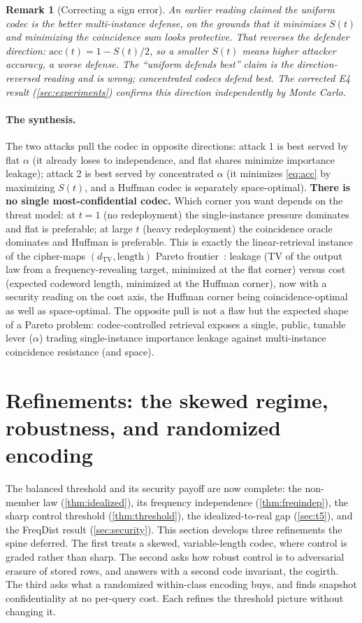 \documentclass[acmsmall,review]{acmart}
\newtheorem{remark}{Remark}
\newcommand{\TV}{d_{\mathrm{TV}}}
\newcommand{\al}{\alpha}                    %
\begin{document}
\begin{remark}[Correcting a sign error]
\label{rem:sign}
An earlier reading claimed the uniform codec is the \emph{better} multi-instance defense,
on the grounds that it minimizes $S(t)$ and minimizing the coincidence sum looks
protective. That reverses the defender direction: $\mathrm{acc}(t) = 1 - S(t)/2$, so a
\emph{smaller} $S(t)$ means \emph{higher} attacker accuracy, a worse defense. The ``uniform
defends best'' claim is the direction-reversed reading and is wrong; concentrated codecs
defend best. The corrected E4 result (\cref{sec:experiments}) confirms this direction
independently by Monte Carlo.
\end{remark}

\paragraph{The synthesis.}
The two attacks pull the codec in opposite directions: attack 1 is best served by flat
$\al$ (it already loses to independence, and flat shares minimize importance leakage);
attack 2 is best served by concentrated $\al$ (it minimizes \eqref{eq:acc} by maximizing
$S(t)$, and a Huffman codec is separately space-optimal). \textbf{There is no single
most-confidential codec.} Which corner you want depends on the threat model: at $t = 1$
(no redeployment) the single-instance pressure dominates and flat is preferable; at large
$t$ (heavy redeployment) the coincidence oracle dominates and Huffman is preferable. This
is exactly the linear-retrieval instance of the cipher-maps $(\TV, \text{length})$ Pareto
frontier~\cite{towell2026ciphermaps}: leakage (TV of the output law from a
frequency-revealing target, minimized at the flat corner) versus cost (expected codeword
length, minimized at the Huffman corner), now with a security reading on the cost axis,
the Huffman corner being coincidence-optimal as well as space-optimal. The opposite pull is
not a flaw but the expected shape of a Pareto problem: codec-controlled retrieval exposes a
single, public, tunable lever ($\al$) trading single-instance importance leakage against
multi-instance coincidence resistance (and space).

\section{Refinements: the skewed regime, robustness, and randomized encoding}
\label{sec:refinements}

The balanced threshold and its security payoff are now complete: the non-member law
(\cref{thm:idealized}), its frequency independence (\cref{thm:freqindep}), the sharp
control threshold (\cref{thm:threshold}), the idealized-to-real gap (\cref{sec:t5}),
and the FreqDist result (\cref{sec:security}). This section develops three refinements
the spine deferred. The first treats a skewed, variable-length codec, where control is
graded rather than sharp. The second asks how robust control is to adversarial erasure
of stored rows, and answers with a second code invariant, the cogirth. The third asks
what a randomized within-class encoding buys, and finds snapshot confidentiality at no
per-query cost. Each refines the threshold picture without changing it.
\end{document}
